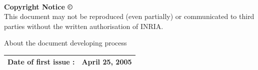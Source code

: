 \textsf{ }\\
\begin{center}
\textbf{Copyright Notice \copyright}\\
This document may not be reproduced (even partially) or communicated to third parties without the written authorisation of INRIA.
\end{center}




\pagebreak
\begin{center}
  \textsf{\Large About the document developing process}
\end{center}
\begin{tabular}{|p{}|p{}|}
\hline
Date of first issue : &\textsf{April 25, 2005}\\
\hline \hline
\hline
\end{tabular}



%

